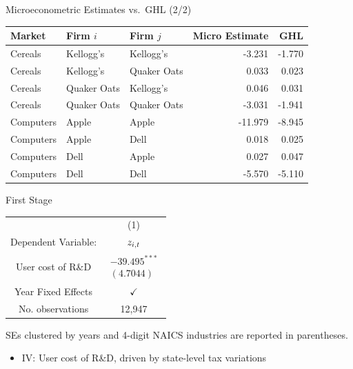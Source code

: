 \documentclass[
  10pt,
  aspectratio=169,   %
]{beamer}
\theoremstyle{plain}
\begin{document}
\begin{frame}[t]{Microeconometric Estimates vs.\ GHL \citep{Pellegrino2024-dn}  (2/2)}
  \begin{center}
    \begin{tabular}{lllrr}
      \toprule
      Market      & Firm $i$           & Firm $j$           & Micro Estimate & GHL    \\
      \midrule
      Cereals     & Kellogg's          & Kellogg's          & -3.231         & -1.770 \\
      Cereals     & Kellogg's          & Quaker Oats        &  0.033         &  0.023 \\
      Cereals     & Quaker Oats        & Kellogg's          &  0.046         &  0.031 \\
      Cereals     & Quaker Oats        & Quaker Oats        & -3.031         & -1.941 \\
      \addlinespace
      Computers   & Apple              & Apple              & -11.979        & -8.945 \\
      Computers   & Apple              & Dell               &  0.018         &  0.025 \\
      Computers   & Dell               & Apple              &  0.027         &  0.047 \\
      Computers   & Dell               & Dell               & -5.570         & -5.110 \\
      \bottomrule
    \end{tabular}
  \end{center}
  \hyperlink{product_identification}{}
\end{frame}

\begin{frame}{First Stage \hyperlink{regression}{}}
  \label{first_stage}
  \begin{center}
    \begin{tabular}{cc}
      \hline
      \hline              & (1)\tabularnewline
      Dependent Variable: & $\text{\ensuremath{z_{i,t}}}$\tabularnewline
      \hline
      User cost of R\&D   & $\begin{array}{c}
      -39.495^{***} \\
      (4.7044)
      \end{array}$\tabularnewline
      \hline
      Year Fixed Effects  & $\checkmark$\tabularnewline
      No. observations    & 12,947\tabularnewline
      \hline
    \end{tabular}
    \medskip{}
  \end{center}
  {\footnotesize
  SEs clustered by years and 4-digit NAICS industries are reported in parentheses.
  }
  \medskip{}
  \begin{itemize}
    \item IV: User cost of R\&D, driven by state-level tax variations \citep{Wilson2009-ri,Bloom2013-pn}
  \end{itemize}
\end{frame}
\end{document}
